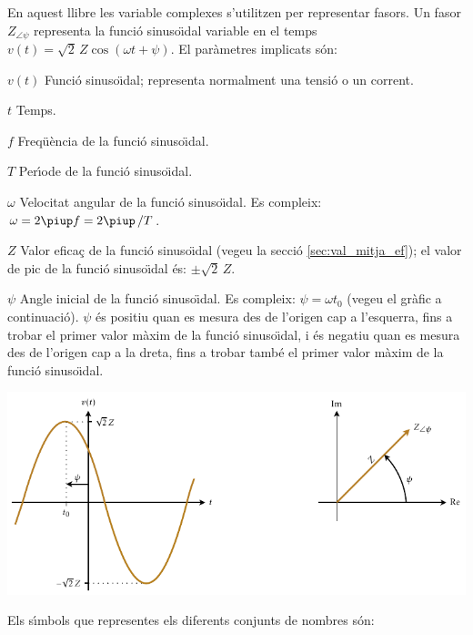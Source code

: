 En aquest llibre les variable complexes s'utilitzen per representar fasors. Un fasor $Z_{\angle \psi}$ representa la funci\'{o} sinuso\"{\i}dal variable en el temps $v(t)=\sqrt{2}\, Z \cos(\omega t + \psi)$. El par\`{a}metres implicats s\'{o}n:
\begin{list}{}
{\setlength{\labelwidth}{15mm} \setlength{\leftmargin}{20mm}
\setlength{\labelsep}{5mm}}
    \item[$v(t)$] Funci\'{o} sinuso\"{\i}dal; representa normalment una tensi\'{o} o un corrent.
    \item[$t$] Temps.
    \item[$f$] Freq\"{u}\`{e}ncia de la funci\'{o} sinuso\"{\i}dal.
    \item[$T$] Per\'{\i}ode de la funci\'{o} sinuso\"{\i}dal.
    \item[$\omega$] Velocitat angular de la funci\'{o} sinuso\"{\i}dal. Es compleix: $\omega = 2 \piup f = 2 \piup\,/T$.
    \item[$Z$] Valor efica\c{c} de la funci\'{o} sinuso\"{\i}dal (vegeu la secci\'{o} \vref{sec:val_mitja_ef}); el valor de pic de la funci\'{o} sinuso\"{\i}dal \'{e}s:  $\pm\sqrt{2}\, Z$.
    \item[$\psi$] Angle inicial de la funci\'{o} sinuso\"{\i}dal. Es compleix:  $\psi=\omega t_0$ (vegeu el gr\`{a}fic a continuaci\'{o}). $\psi$ \'{e}s positiu quan es mesura des de l'origen cap a l'esquerra, fins a trobar el primer valor m\`{a}xim de la funci\'{o} sinuso\"{\i}dal, i \'{e}s negatiu quan es mesura des de l'origen cap a la dreta, fins a trobar tamb\'{e} el primer valor m\`{a}xim de la funci\'{o} sinuso\"{\i}dal.
    \item[] \includegraphics{Imatges/Not-Fasor.pdf}
\end{list}

Els s\'{\i}mbols que representes els diferents conjunts de nombres s\'{o}n:

